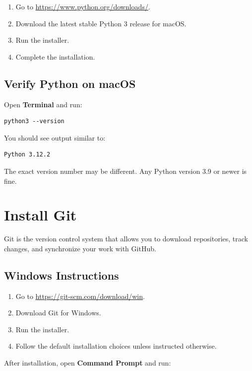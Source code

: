 \documentclass[11pt]{article}
\begin{document}
\begin{enumerate}
    \item Go to \url{https://www.python.org/downloads/}.
    \item Download the latest stable Python 3 release for macOS.
    \item Run the installer.
    \item Complete the installation.
\end{enumerate}

\subsection*{Verify Python on macOS}

Open \textbf{Terminal} and run:

\begin{lstlisting}[style=terminal]
python3 --version
\end{lstlisting}

You should see output similar to:

\begin{lstlisting}[style=terminal]
Python 3.12.2
\end{lstlisting}

The exact version number may be different. Any Python version 3.9 or newer is fine.

\section{Install Git}

Git is the version control system that allows you to download repositories, track changes, and synchronize your work with GitHub.

\subsection*{Windows Instructions}

\begin{enumerate}
    \item Go to \url{https://git-scm.com/download/win}.
    \item Download Git for Windows.
    \item Run the installer.
    \item Follow the default installation choices unless instructed otherwise.
\end{enumerate}

After installation, open \textbf{Command Prompt} and run:
\end{document}
